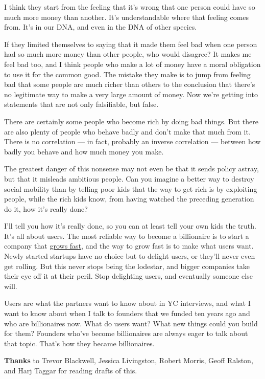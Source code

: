 I think they start from the feeling that it's wrong that one person
could have so much more money than another. It's understandable where
that feeling comes from. It's in our DNA, and even in the DNA of other
species.

If they limited themselves to saying that it made them feel bad when one
person had so much more money than other people, who would disagree? It
makes me feel bad too, and I think people who make a lot of money have a
moral obligation to use it for the common good. The mistake they make is
to jump from feeling bad that some people are much richer than others to
the conclusion that there's no legitimate way to make a very large
amount of money. Now we're getting into statements that are not only
falsifiable, but false.

There are certainly some people who become rich by doing bad things. But
there are also plenty of people who behave badly and don't make that
much from it. There is no correlation --- in fact, probably an inverse
correlation --- between how badly you behave and how much money you
make.

The greatest danger of this nonsense may not even be that it sends
policy astray, but that it misleads ambitious people. Can you imagine a
better way to destroy social mobility than by telling poor kids that the
way to get rich is by exploiting people, while the rich kids know, from
having watched the preceding generation do it, how it's really done?

I'll tell you how it's really done, so you can at least tell your own
kids the truth. It's all about users. The most reliable way to become a
billionaire is to start a company that \href{growth.html}{grows fast},
and the way to grow fast is to make what users want. Newly started
startups have no choice but to delight users, or they'll never even get
rolling. But this never stops being the lodestar, and bigger companies
take their eye off it at their peril. Stop delighting users, and
eventually someone else will.

Users are what the partners want to know about in YC interviews, and
what I want to know about when I talk to founders that we funded ten
years ago and who are billionaires now. What do users want? What new
things could you build for them? Founders who've become billionaires are
always eager to talk about that topic. That's how they became
billionaires.


\textbf{Thanks} to Trevor Blackwell, Jessica Livingston, Robert Morris,
Geoff Ralston, and Harj Taggar for reading drafts of this.